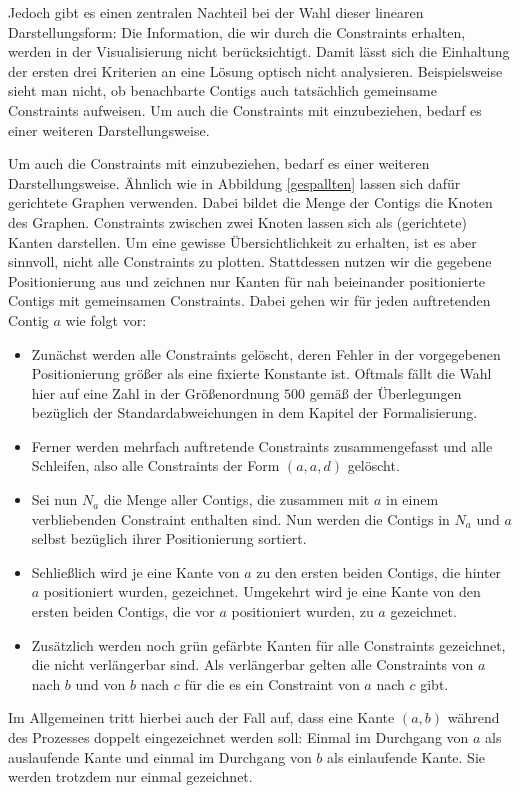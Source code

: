 Jedoch gibt es einen zentralen Nachteil bei der Wahl dieser linearen Darstellungsform: Die Information, die wir durch die Constraints erhalten, werden in der Visualisierung nicht berücksichtigt.
Damit lässt sich die Einhaltung der ersten drei Kriterien an eine Lösung optisch nicht analysieren.
Beispielsweise sieht man nicht, ob benachbarte Contigs auch tatsächlich gemeinsame Constraints aufweisen.
Um auch die Constraints mit einzubeziehen, bedarf es einer weiteren Darstellungsweise.

Um auch die Constraints mit einzubeziehen, bedarf es einer weiteren Darstellungsweise.
Ähnlich wie in Abbildung \ref{gespallten} lassen sich dafür gerichtete Graphen verwenden. Dabei bildet die Menge der Contigs die Knoten des Graphen. Constraints zwischen zwei Knoten lassen sich als (gerichtete) Kanten darstellen.
Um eine gewisse Übersichtlichkeit zu erhalten, ist es aber sinnvoll, nicht alle Constraints zu plotten.
Stattdessen nutzen wir die gegebene Positionierung aus und zeichnen nur Kanten für nah beieinander positionierte Contigs mit gemeinsamen Constraints. %
Dabei gehen wir für jeden auftretenden Contig $a$ wie folgt vor:
\begin{itemize}
	\item Zunächst werden alle Constraints gelöscht, deren Fehler in der vorgegebenen Positionierung größer als eine fixierte Konstante ist. Oftmals fällt die Wahl hier auf eine Zahl in der Größenordnung $500$ gemäß der Überlegungen bezüglich der Standardabweichungen in dem Kapitel der Formalisierung.
	\item Ferner werden mehrfach auftretende Constraints zusammengefasst und alle Schleifen, also alle Constraints der Form $(a, a, d)$ gelöscht.
	\item Sei nun $N_a$ die Menge aller Contigs, die zusammen mit $a$ in einem verbliebenden Constraint enthalten sind. Nun werden die Contigs in $N_a$ und $a$ selbst bezüglich ihrer Positionierung sortiert.
	\item Schließlich wird je eine Kante von $a$ zu den ersten beiden Contigs, die hinter $a$ positioniert wurden, gezeichnet. Umgekehrt wird je eine Kante von den ersten beiden Contigs, die vor $a$ positioniert wurden, zu $a$ gezeichnet.
	\item Zusätzlich werden noch grün gefärbte Kanten 
	für alle Constraints gezeichnet, die nicht verlängerbar sind. Als verlängerbar gelten alle Constraints von $a$ nach $b$ und von $b$ nach $c$ für die es ein Constraint von $a$ nach $c$ gibt.
\end{itemize}
Im Allgemeinen tritt hierbei auch der Fall auf, dass eine Kante $(a,b)$ während des Prozesses doppelt eingezeichnet werden soll: Einmal im Durchgang von $a$ als auslaufende Kante und einmal im Durchgang von $b$ als einlaufende Kante.
Sie werden trotzdem nur einmal gezeichnet.

